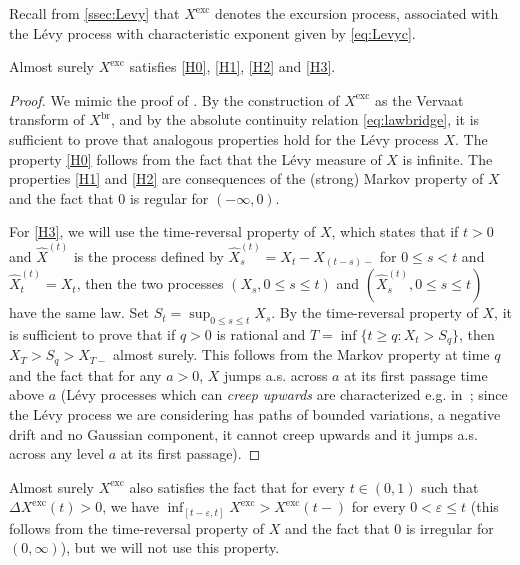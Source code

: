 \documentclass[AHL,XML,longabstracts,Unicode]{cedram}
\def \Xexc{X^{\mathrm{exc}}}
\def \Xbr{X^{\mathrm{br}}}
\begin{document}
Recall from \cref{ssec:Levy} that $\Xexc$ denotes the excursion process,
associated with the L\'evy process with characteristic exponent given by \eqref{eq:Levyc}.
\begin{lemma}Almost surely $\Xexc$  satisfies \ref{H0}, \ref{H1}, \ref{H2} and \ref{H3}.
  \label{lem:hypoX}
\end{lemma}

\begin{proof}
We mimic the proof of \cite[Proposition 2.10]{Kor14}.
By the construction of $\Xexc$ as the Vervaat transform of $\Xbr$, and by the absolute continuity relation \eqref{eq:lawbridge}, it is sufficient to prove that analogous properties hold
for the L\'evy process $X$.  The property \ref{H0} follows from the fact that the L\'evy measure of $X$ is infinite. The properties \ref{H1} and \ref{H2} are consequences
of the (strong) Markov property of $X$ and the fact that $0$ is regular for $(-\infty,0)$.

For \ref{H3}, we will use the time-reversal property of $X$, which
states that if $t > 0$ and $\widehat{X}^{(t)}$ is the process defined by $\widehat{X}^{(t)}_{s}=X_{t}-X_{(t-s)-}$ for $0 \leq s<t$ and $\widehat{X}^{(t)}_{t}=X_{t}$, then the two processes $(X_{s},0 \leq s \leq t)$ and $(\widehat{X}^{(t)}_{s},0 \leq s \leq t)$ have the same law.
Set $S_{t}= \sup_{0 \leq s \leq t} X_{s}$. By the time-reversal property of $X$,
it is sufficient to prove that if $q > 0$ is rational and $T = \inf\{t  \geq  q : X_{t} > S_{q}\}$, then
$X_{T} > S_{q}  > X_{T-}$ almost surely. This follows from the Markov property at time $q$
and the fact that for any $a > 0$, $X$ jumps a.s. across $a$ at its first passage time
above $a$ (L\'evy processes which can {\em creep upwards}
are characterized e.g. in~\cite[Theorem 7.11]{Kyp06};
since the L\'evy process we are considering has paths of bounded variations,
a negative drift and no Gaussian component, it cannot creep upwards
and it jumps a.s. across any level $a$ at its first passage).
\end{proof}

\begin{remark}
Almost surely $\Xexc$ also satisfies the fact that for every $t \in (0,1)$ such that $\Delta \Xexc(t) > 0$, we have $\inf_{[t-\varepsilon, t]} \Xexc > \Xexc(t-)$ for every $0 < \varepsilon \le t$ (this follows from the time-reversal property of $X$ and the fact that $0$ is irregular for $(0,\infty)$), but we will not use this property.
\end{remark}
\end{document}
